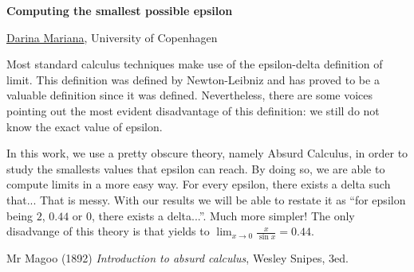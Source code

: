 \documentclass[a4paper, 11pt]{article}
\newcommand{\abstracttitle}[1]{{ \centering \LARGE \textbf{#1}\\ \vspace*{0.7cm} }}
\newcommand{\firstauthor}[2]{{ \centering \underline{#1}, \textsf{#2}\\ \vspace*{0.25cm} }}
\newcommand{\otherauthor}[2]{{ \centering #1, \textsf{#2}\\ \vspace*{0.25cm} }}
\newcommand{\abstracttext}[1]{ \vspace{0.6cm} #1 }
\begin{document}
\abstracttitle{Computing the smallest possible epsilon}

\firstauthor{Darina Mariana}{University of Copenhagen}

\abstracttext{
    Most standard calculus techniques make use of the epsilon-delta definition of limit. This definition was defined by Newton-Leibniz and has proved to be a valuable definition since it was defined. Nevertheless, there are some voices pointing out the most evident disadvantage of this definition: we still do not know the exact value of epsilon.

    In this work, we use a pretty obscure theory, namely Absurd Calculus, in order to study the smallests values that epsilon can reach. By doing so, we are able to compute limits in a more easy way. For every epsilon, there exists a delta such that... That is messy. With our results we will be able to restate it as ``for epsilon being $2$, $0.44$ or $0$, there exists a delta...''. Much more simpler! The only disadvange of this theory is that yields to $\lim_{x \to 0} \frac{x}{\sin x} = 0.44$.
}

\begin{thebibliography}{9}
Mr Magoo (1892) \emph{Introduction to absurd calculus}, Wesley Snipes, 3ed.
\end{thebibliography}
\end{document}
